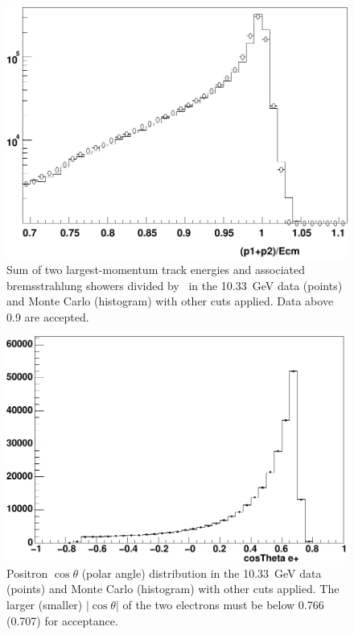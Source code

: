 \documentclass{cornell}
\begin{document}
\begin{figure}[p]
  \begin{center}
    \includegraphics[width=0.7\linewidth]{plots/eeagreementa}
  \end{center}
  \caption[Sum of the two largest-momentum tracks in Bhabha events]{\label{eeagreementc} Sum of two largest-momentum track
  energies and associated bremsstrahlung showers divided by \ecm\ in
  the 10.33~GeV data (points) and Monte Carlo (histogram) with other
  cuts applied.  Data above 0.9 are accepted.}
\end{figure}

\begin{figure}[p]
  \begin{center}
    \includegraphics[width=0.7\linewidth]{plots/eeagreementd}
  \end{center}
  \caption[Positron $\cos\theta$ distribution in Bhabha events]{\label{eeagreementd} Positron $\cos\theta$ (polar angle)
  distribution in the 10.33~GeV data (points) and Monte Carlo
  (histogram) with other cuts applied.  The larger (smaller)
  $|\cos\theta|$ of the two electrons must be below 0.766 (0.707) for
  acceptance.}
\end{figure}
\end{document}

